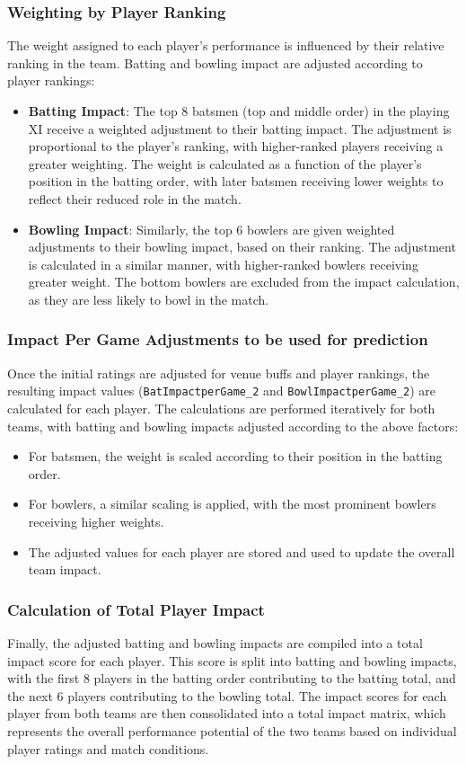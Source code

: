 \documentclass{article}[12pt]
\begin{document}
\subsubsection{Weighting by Player Ranking}
The weight assigned to each player's performance is influenced by their relative ranking in the team. Batting and bowling impact are adjusted according to player rankings:
\begin{itemize}
    \item \textbf{Batting Impact}: The top 8 batsmen (top and middle order) in the playing XI receive a weighted adjustment to their batting impact. The adjustment is proportional to the player’s ranking, with higher-ranked players receiving a greater weighting. The weight is calculated as a function of the player's position in the batting order, with later batsmen receiving lower weights to reflect their reduced role in the match.
    \item \textbf{Bowling Impact}: Similarly, the top 6 bowlers are given weighted adjustments to their bowling impact, based on their ranking. The adjustment is calculated in a similar manner, with higher-ranked bowlers receiving greater weight. The bottom bowlers are excluded from the impact calculation, as they are less likely to bowl in the match.
\end{itemize}

\subsubsection{Impact Per Game Adjustments to be used for prediction}
Once the initial ratings are adjusted for venue buffs and player rankings, the resulting impact values (\texttt{BatImpactperGame\_2} and \texttt{BowlImpactperGame\_2}) are calculated for each player. The calculations are performed iteratively for both teams, with batting and bowling impacts adjusted according to the above factors:
\begin{itemize}
    \item For batsmen, the weight is scaled according to their position in the batting order.
    \item For bowlers, a similar scaling is applied, with the most prominent bowlers receiving higher weights.
    \item The adjusted values for each player are stored and used to update the overall team impact.
\end{itemize}

\subsubsection{Calculation of Total Player Impact}
Finally, the adjusted batting and bowling impacts are compiled into a total impact score for each player. This score is split into batting and bowling impacts, with the first 8 players in the batting order contributing to the batting total, and the next 6 players contributing to the bowling total. The impact scores for each player from both teams are then consolidated into a total impact matrix, which represents the overall performance potential of the two teams based on individual player ratings and match conditions.
\end{document}
